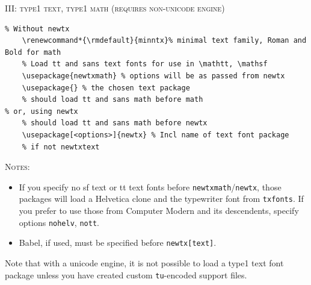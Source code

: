 \documentclass[\fsc]{article}
\theoremstyle{oldplain}
\theoremstyle{plain}
\begin{document}
\textsc{III: type1 text, type1 math (requires non-unicode engine)}
\begin{verbatim}
% Without newtx
    \renewcommand*{\rmdefault}{minntx}% minimal text family, Roman and Bold for math
    % Load tt and sans text fonts for use in \mathtt, \mathsf   
    \usepackage{newtxmath} % options will be as passed from newtx
    \usepackage{} % the chosen text package
    % should load tt and sans math before math
% or, using newtx
    % should load tt and sans math before newtx
    \usepackage[<options>]{newtx} % Incl name of text font package
	% if not newtxtext
\end{verbatim}
\textsc{Notes:}

\begin{itemize}
\item If you specify no sf text or tt text fonts before {\tt newtxmath}/{\tt newtx}, those packages will load a Helvetica clone and the typewriter font from {\tt txfonts}. If you prefer to use those from Computer Modern and its descendents, specify options {\tt nohelv}, {\tt nott}.
\item Babel, if used, must be specified before {\tt newtx[text]}.
\end{itemize}

Note that with a unicode engine, it is not possible to load a type1 text font package unless you have created custom {\tt tu}-encoded support files.
\end{document}
